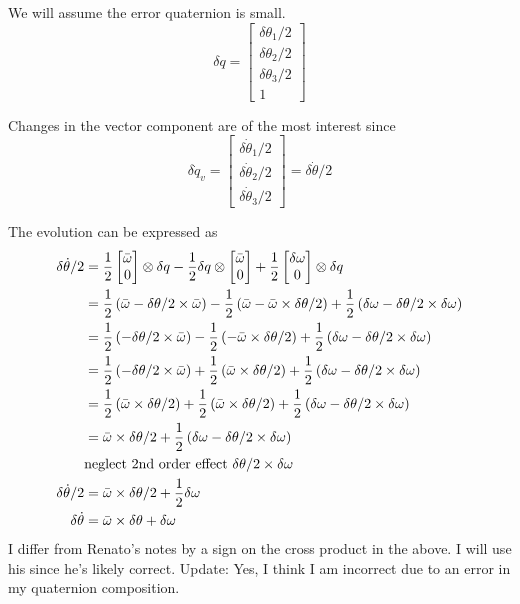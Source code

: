 \documentclass[]{article}
\begin{document}
We will assume the error quaternion is small.
\begin{equation}
	\delta q = \begin{bmatrix}
		\delta \theta_1/2 \\
		\delta \theta_2/2 \\
		\delta \theta_3/2 \\
		1
	\end{bmatrix}
\end{equation}

Changes in the vector component are of the most interest since
\begin{equation}
	\delta \dot{q}_v = \begin{bmatrix}
		\delta \dot{\theta}_1/2 \\
		\delta \dot{\theta}_2/2 \\
		\delta \dot{\theta}_3/2
	\end{bmatrix} = \delta \dot{\theta}/2
\end{equation}

The evolution can be expressed as
\begin{align}
	\delta \dot{\theta}/2 & = \frac{1}{2} \begin{bmatrix} \bar{\omega} \\ 0 \end{bmatrix} \otimes \delta q - \frac{1}{2} \delta q \otimes \begin{bmatrix} \bar{\omega} \\ 0 \end{bmatrix} + \frac{1}{2} \begin{bmatrix} \delta \omega \\ 0 \end{bmatrix} \otimes \delta q \\
	& = \frac{1}{2} \left( \bar{\omega} - \delta \theta/2 \times \bar{\omega} \right) - \frac{1}{2} \left( \bar{\omega} - \bar{\omega} \times \delta \theta/2\right) + \frac{1}{2} \left( \delta \omega - \delta \theta/2 \times \delta \omega \right) \\
	& = \frac{1}{2} \left( - \delta \theta/2 \times \bar{\omega} \right) - \frac{1}{2} \left( - \bar{\omega} \times \delta \theta/2\right) + \frac{1}{2} \left( \delta \omega - \delta \theta/2 \times \delta \omega \right) \\
	& = \frac{1}{2} \left( - \delta \theta/2 \times \bar{\omega} \right) + \frac{1}{2} \left( \bar{\omega} \times \delta \theta/2\right) + \frac{1}{2} \left( \delta \omega - \delta \theta/2 \times \delta \omega \right) \\
	& = \frac{1}{2} \left( \bar{\omega} \times \delta \theta/2  \right) + \frac{1}{2} \left( \bar{\omega} \times \delta \theta/2\right) + \frac{1}{2} \left( \delta \omega - \delta \theta/2 \times \delta \omega \right) \\
	& = \bar{\omega} \times \delta \theta/2 + \frac{1}{2} \left( \delta \omega - \delta \theta/2 \times \delta \omega \right) \\
	& \text{neglect 2nd order effect } \delta \theta/2 \times \delta \omega \\
	\delta \dot{\theta}/2 & = \bar{\omega} \times \delta \theta/2 + \frac{1}{2} \delta \omega \\
	\delta \dot{\theta} & = \bar{\omega} \times \delta \theta + \delta \omega
\end{align}
I differ from Renato's notes by a sign on the cross product in the above. I will use his since he's likely correct. Update: Yes, I think I am incorrect due to an error in my quaternion composition.
\end{document}
